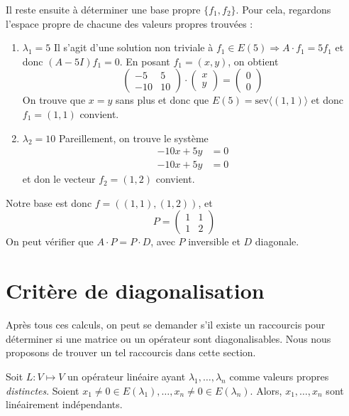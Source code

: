 \begin{exemple}
Il reste ensuite à déterminer une base propre $\{ f_1, f_2 \}$. Pour cela, regardons l'espace propre de chacune des valeurs propres trouvées :
\begin{enumerate}
\item $\lambda_1 = 5$
Il s'agit d'une solution non triviale à $f_1 \in E(5) \Rightarrow A\cdot f_1 = 5f_1$ et donc $(A-5I)f_1=0$. En posant $f_1 = (x, y)$, on obtient
\[ \begin{pmatrix} -5 & 5 \\ -10 & 10 \end{pmatrix} \cdot \begin{pmatrix} x \\ y \end{pmatrix} = \begin{pmatrix} 0 \\ 0 \end{pmatrix} \]
On trouve que $x=y$ sans plus et donc que $E(5)=\mathrm{sev} \langle (1, 1) \rangle$ et donc $f_1 = (1,1)$ convient.
\item $\lambda_2 = 10$
Pareillement, on trouve le système
\begin{align*}
-10x + 5y &= 0 \\
-10x+5y &= 0
\end{align*}
et don le vecteur $f_2=(1,2)$ convient.
\end{enumerate}

Notre base est donc $f=((1, 1), (1, 2))$, et
\[ P = \begin{pmatrix}
1 & 1 \\ 1 & 2
\end{pmatrix} \]
On peut vérifier que $A\cdot P = P\cdot D$, avec $P$ inversible et $D$ diagonale.
\end{exemple}

\section{Critère de diagonalisation}

Après tous ces calculs, on peut se demander s'il existe un raccourcis pour déterminer si une matrice ou un opérateur sont diagonalisables. Nous nous proposons de trouver un tel raccourcis dans cette section.

\begin{lemme}
Soit $L \colon V \mapsto V$ un opérateur linéaire ayant $\lambda_1, \ldots, \lambda_n$ comme valeurs propres \emph{distinctes}. Soient $x_1 \neq 0 \in E(\lambda_1), \ldots, x_n \neq 0 \in E(\lambda_n)$. Alors, $x_1, \ldots, x_n$ sont linéairement indépendants.
\end{lemme}

